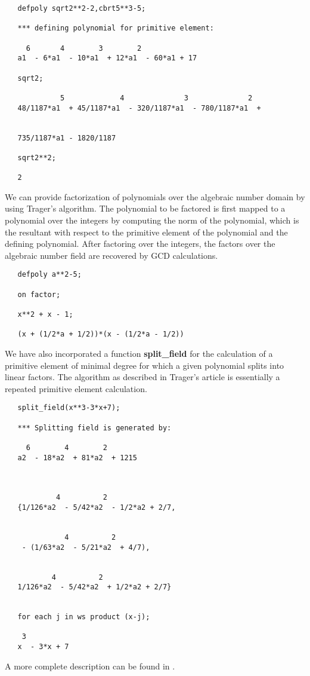\example{}

\begin{verbatim}
   defpoly sqrt2**2-2,cbrt5**3-5;

   *** defining polynomial for primitive element:

     6       4        3        2
   a1  - 6*a1  - 10*a1  + 12*a1  - 60*a1 + 17

   sqrt2;

             5             4              3              2
   48/1187*a1  + 45/1187*a1  - 320/1187*a1  - 780/1187*a1  +


   735/1187*a1 - 1820/1187

   sqrt2**2;

   2
\end{verbatim}
\newpage
We can provide factorization of polynomials over the algebraic number
domain by using Trager's algorithm.  The polynomial to be factored is first
mapped to a polynomial over the integers by computing the norm of the
polynomial, which is the resultant with respect to the primitive element of
the polynomial and the defining polynomial.  After factoring over the
integers, the factors over the algebraic number field are recovered by GCD
calculations.

\example{}

\begin{verbatim}
   defpoly a**2-5;

   on factor;

   x**2 + x - 1;

   (x + (1/2*a + 1/2))*(x - (1/2*a - 1/2))
\end{verbatim}
We have also incorporated a function {\bf split\_field} for the calculation
of a primitive element of minimal degree for which a given polynomial splits
into linear factors.  The algorithm as described in Trager's article is
essentially a repeated primitive element calculation.

\example{}

\begin{verbatim}
   split_field(x**3-3*x+7);

   *** Splitting field is generated by:

     6        4        2
   a2  - 18*a2  + 81*a2  + 1215



            4          2
   {1/126*a2  - 5/42*a2  - 1/2*a2 + 2/7,


              4          2
    - (1/63*a2  - 5/21*a2  + 4/7),


           4          2
   1/126*a2  - 5/42*a2  + 1/2*a2 + 2/7}


   for each j in ws product (x-j);

    3
   x  - 3*x + 7
\end{verbatim}

A more complete description can be found in \cite{Bradford:86}.


